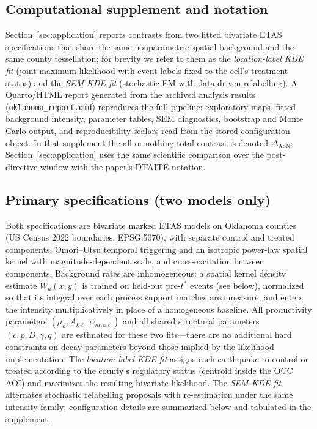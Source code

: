 \documentclass{statsoc}
\newcommand{\1}{\mathbbm{1}}
\begin{document}
\subsection{Computational supplement and notation}\label{sec:ok_computational}
Section~\ref{sec:application} reports contrasts from two fitted bivariate ETAS specifications that share the same nonparametric spatial background and the same county tessellation; for brevity we refer to them as the \emph{location-label KDE fit} (joint maximum likelihood with event labels fixed to the cell's treatment status) and the \emph{SEM KDE fit} (stochastic EM with data-driven relabelling). A Quarto/HTML report generated from the archived analysis results (\verb|oklahoma_report.qmd|) reproduces the full pipeline: exploratory maps, fitted background intensity, parameter tables, SEM diagnostics, bootstrap and Monte Carlo output, and reproducibility scalars read from the stored configuration object. In that supplement the all-or-nothing total contrast is denoted $\Delta_{\mathrm{AoN}}$; Section~\ref{sec:application} uses the same scientific comparison over the post-directive window with the paper's DTAITE notation.

\subsection{Primary specifications (two models only)}\label{sec:ok_primary_models}
Both specifications are bivariate marked ETAS models on Oklahoma counties (US Census 2022 boundaries, EPSG:5070), with separate control and treated components, Omori--Utsu temporal triggering and an isotropic power-law spatial kernel with magnitude-dependent scale, and cross-excitation between components. Background rates are inhomogeneous: a spatial kernel density estimate $W_k(x,y)$ is trained on held-out pre-$t^\ast$ events (see below), normalized so that its integral over each process support matches area measure, and enters the intensity multiplicatively in place of a homogeneous baseline. All productivity parameters $(\mu_k,A_{k\ell},\alpha_{m,k\ell})$ and all shared structural parameters $(c,p,D,\gamma,q)$ are estimated for these two fits---there are no additional hard constraints on decay parameters beyond those implied by the likelihood implementation. The \emph{location-label KDE fit} assigns each earthquake to control or treated according to the county's regulatory status (centroid inside the OCC AOI) and maximizes the resulting bivariate likelihood. The \emph{SEM KDE fit} alternates stochastic relabelling proposals with re-estimation under the same intensity family; configuration details are summarized below and tabulated in the supplement.
\end{document}
